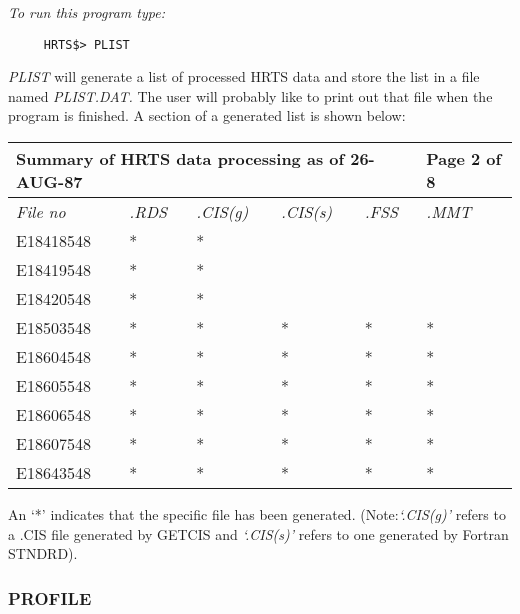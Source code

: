 {\em To run this program type:}
\begin{verbatim}
     HRTS$> PLIST
\end{verbatim}
{\em PLIST} will generate a list of processed HRTS data and store the list
   in a file named {\em PLIST.DAT.}  The user will probably like to print out
   that file when the program is finished.  A section of a generated list
   is shown below:
\begin{center}
\begin{tabular}{||l l l l l l||}
\hline
\multicolumn{5}{||l}{\bf Summary of HRTS data processing as of 26-AUG-87}  &
\multicolumn{1}{l||}{\bf Page 2 of 8} \\
\hline
{\em File no} & {\em .RDS} & {\em .CIS(g)} & {\em .CIS(s)} & {\em .FSS} & {\em
.MMT} \\
      E18418548    &     *    &     *   &        &           &              \\
      E18419548    &     *    &     *   &        &           &              \\
      E18420548    &     *    &     *   &        &           &              \\
      E18503548    &     *    &     *   &      * &         * &         *    \\
      E18604548    &     *    &     *   &      * &         * &         *    \\
      E18605548    &     *    &     *   &      * &         * &         *    \\
      E18606548    &     *    &     *   &      * &         * &         *    \\
      E18607548    &     *    &     *   &      * &         * &         *    \\
      E18643548    &     *    &     *   &      * &         * &         *    \\
\hline
\end{tabular}
\end{center}
  An `*' indicates that the specific file has been generated.
 (Note:{\em `.CIS(g)'} refers to a .CIS file generated by GETCIS and
{\em `.CIS(s)'} refers to one generated by Fortran STNDRD).

\subsubsection{PROFILE}

